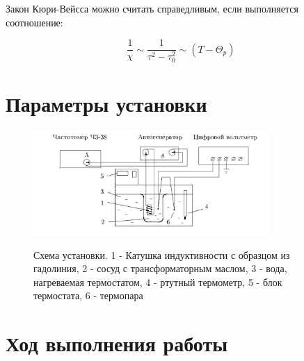\documentclass[10pt,a4paper]{article}
\begin{document}
	Закон Кюри-Вейсса можно считать справедливым, если выполняется соотношение: 
	
	\begin{equation}
		\frac{1}{\chi} \sim \frac{1}{\tau^{2} - \tau^{2}_{0}} \sim \left(T - \Theta_{p}\right)
	\end{equation}
	
	\section{Параметры установки}
	
	\begin{figure}[h!]
		\begin{center}
			\includegraphics[width = 0.8\textwidth]{schem_of_facility}
			\label{fig:schem_of_facility}
			\caption{Схема установки. 1 - Катушка индуктивности с образцом из гадолиния, 2 - сосуд с трансформаторным маслом, 3 - вода, нагреваемая термостатом, 4 - ртутный термометр, 5 - блок термостата, 6 - термопара}
		\end{center}
	\end{figure}
	\newpage
	
	\section{Ход выполнения работы}
	
\end{document}
